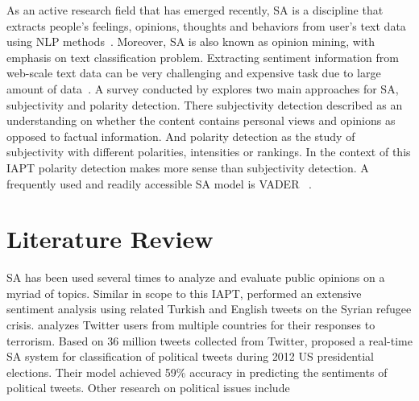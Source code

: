 As an active research field that has emerged recently, \ac{SA} is a discipline that extracts people’s feelings, opinions, thoughts and behaviors from user’s text data using \ac{NLP} methods~\citep{danneman2014social}.
Moreover, \ac{SA} is also known as opinion mining, with emphasis on text classification problem.
Extracting sentiment information from web-scale text data can be very challenging and expensive task due to large amount of data~\citep{FernndezGavilanes2016}.
A survey conducted by \citet{Lo2016} explores two main approaches for \ac{SA}, subjectivity and polarity detection.
There subjectivity detection described as an understanding on whether the content contains personal views and opinions as opposed to factual information.
And polarity detection as the study of subjectivity with different polarities, intensities or rankings.
In the context of this \ac{IAPT} polarity detection makes more sense than subjectivity detection.
A frequently used and readily accessible \ac{SA} model is \ac{VADER} ~\citep{Hutto_Gilbert_2014}.



\section{Literature Review}

\ac{SA} has been used several times to analyze and evaluate public opinions on a myriad of topics.
Similar in scope to this \ac{IAPT}, \citet{ztrk2018} performed an extensive sentiment analysis using related Turkish and English tweets on the Syrian refugee crisis.
\citet{MANSOUR201895} analyzes Twitter users from multiple countries for their responses to terrorism.
Based on 36 million tweets collected from Twitter, \citet{wang2012system} proposed a real-time \ac{SA} system for classification of political tweets during 2012 US presidential elections.
Their model achieved 59\% accuracy in predicting the sentiments of political tweets.
Other research on political issues include~\citep{park2016expanding, ahmed20162014, bollen2011twitter, cheong2011microblogging}


